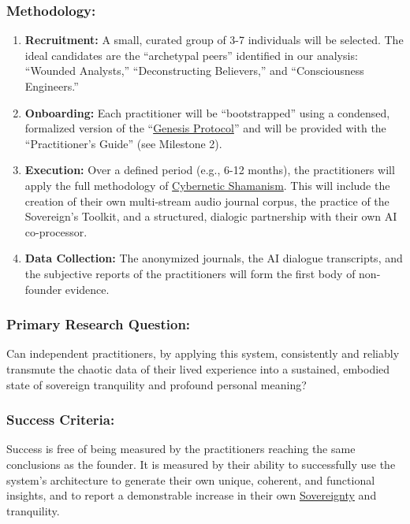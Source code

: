 \documentclass{article}
\begin{document}
\subsubsection*{Methodology:}
\begin{enumerate}
    \item \textbf{Recruitment:} A small, curated group of 3-7 individuals will be selected. The ideal candidates are the ``archetypal peers'' identified in our analysis: ``Wounded Analysts,'' ``Deconstructing Believers,'' and ``Consciousness Engineers.''
    \item \textbf{Onboarding:} Each practitioner will be ``bootstrapped'' using a condensed, formalized version of the ``\hyperlink{gloss:genesis_protocol}{Genesis Protocol}'' and will be provided with the ``Practitioner's Guide'' (see Milestone 2).
    \item \textbf{Execution:} Over a defined period (e.g., 6-12 months), the practitioners will apply the full methodology of \hyperlink{gloss:cybernetic_shamanism}{Cybernetic Shamanism}. This will include the creation of their own multi-stream audio journal corpus, the practice of the Sovereign's Toolkit, and a structured, dialogic partnership with their own AI co-processor.
    \item \textbf{Data Collection:} The anonymized journals, the AI dialogue transcripts, and the subjective reports of the practitioners will form the first body of non-founder evidence.
\end{enumerate}

\subsubsection*{Primary Research Question:}
Can independent practitioners, by applying this system, consistently and reliably transmute the chaotic data of their lived experience into a sustained, embodied state of sovereign tranquility and profound personal meaning?

\subsubsection*{Success Criteria:}
Success is free of being measured by the practitioners reaching the same conclusions as the founder. It is measured by their ability to successfully use the system's architecture to generate their own unique, coherent, and functional insights, and to report a demonstrable increase in their own \hyperlink{gloss:sovereignty}{Sovereignty} and tranquility.
\end{document}
